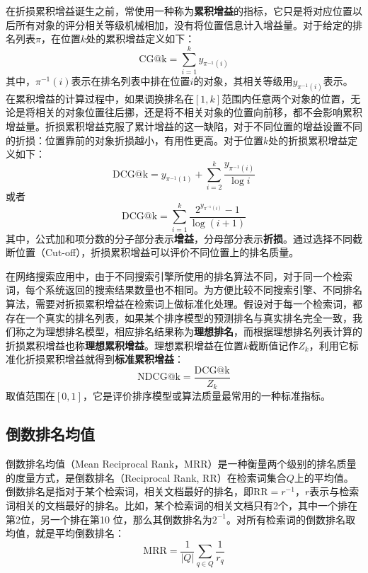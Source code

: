 在折损累积增益诞生之前，常使用一种称为\textbf{累积增益}的指标，它只是将对应位置以后所有对象的评分相关等级机械相加，没有将位置信息计入增益量。对于给定的排名列表$\pi$，在位置$k$处的累积增益定义如下：
\begin{equation}
    \text{CG@k} = \sum\limits_{i=1}^k y_{\pi^{-1}(i)}
\end{equation}
其中，$\pi^{-1}(i)$表示在排名列表中排在位置$i$的对象，其相关等级用$y_{\pi^{-1}(i)}$表示。在累积增益的计算过程中，如果调换排名在$[1,k]$范围内任意两个对象的位置，无论是将相关的对象位置往后挪，还是将不相关对象的位置向前移，都不会影响累积增益量。折损累积增益克服了累计增益的这一缺陷，对于不同位置的增益设置不同的折损：位置靠前的对象折损越小，有用性更高。对于位置$k$处的折损累积增益定义如下：
\begin{equation}
    \text{DCG@k} = y_{\pi^{-1}(1)} + \sum\limits_{i=2}^k \frac{y_{\pi^{-1}(i)}}{\log i}
\end{equation}
或者
\begin{equation}
    \text{DCG@k} = \sum\limits_{i=1}^k \frac{2^{y_{\pi^{-1}(i)}}-1}{\log (i+1)}
\end{equation}
其中，公式加和项分数的分子部分表示\textbf{增益}，分母部分表示\textbf{折损}。通过选择不同截断位置（Cut-off），折损累积增益可以评价不同位置上的排名质量。

在网络搜索应用中，由于不同搜索引擎所使用的排名算法不同，对于同一个检索词，每个系统返回的搜索结果数量也不相同。为方便比较不同搜索引擎、不同排名算法，需要对折损累积增益在检索词上做标准化处理。假设对于每一个检索词，都存在一个真实的排名列表，如果某个排序模型的预测排名与真实排名完全一致，我们称之为理想排名模型，相应排名结果称为\textbf{理想排名}，而根据理想排名列表计算的折损累积增益也称\textbf{理想累积增益}。理想累积增益在位置$k$截断值记作$Z_k$，利用它标准化折损累积增益就得到\textbf{标准累积增益}：
\begin{equation}
    \text{NDCG@k} = \frac{\text{DCG@k}}{Z_k}
\end{equation}
取值范围在$[0,1]$，它是评价排序模型或算法质量最常用的一种标准指标。

\subsection{倒数排名均值}
倒数排名均值（Mean Reciprocal Rank，MRR）是一种衡量两个级别的排名质量的度量方式，是倒数排名（Reciprocal Rank, RR）在检索词集合$Q$上的平均值。倒数排名是指对于某个检索词，相关文档最好的排名，即$\mathrm{RR}=r^{-1}$，$r$表示与检索词相关的文档最好的排名。比如，某个检索词的相关文档只有2个，其中一个排在第2位，另一个排在第10 位，那么其倒数排名为$2^{-1}$。对所有检索词的倒数排名取均值，就是平均倒数排名：
\begin{equation}\label{eq:mrr}
    \text{MRR}=\frac{1}{|Q|}\sum_{q\in Q}{\frac{1}{r_q}}
\end{equation}

